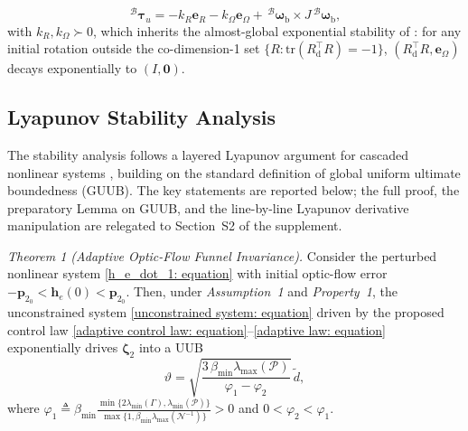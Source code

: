 \begin{equation} \label{so3 torque: equation}
    \,^\mathcal{B}\boldsymbol{\tau}_u = -k_R\boldsymbol{e}_R - k_\Omega\boldsymbol{e}_\Omega + \,^\mathcal{B} \boldsymbol{\omega}_{\text{b}}\times J\,^\mathcal{B} \boldsymbol{\omega}_{\text{b}},
\end{equation}
with $k_R,k_\Omega\succ 0$, which inherits the almost-global exponential stability of \cite[Thm.~3.1]{lee2010}: for any initial rotation outside the co-dimension-1 set $\{R:\text{tr}(R_\text{d}^\top R)=-1\}$, $(R_\text{d}^\top R,\boldsymbol{e}_\Omega)$ decays exponentially to $(I,\boldsymbol{0})$.

\subsection{Lyapunov Stability Analysis} \label{stability: section}
The stability analysis follows a layered Lyapunov argument for cascaded nonlinear systems \cite{khalil2002}, building on the standard definition of global uniform ultimate boundedness (GUUB). The key statements are reported below; the full proof, the preparatory Lemma on GUUB, and the line-by-line Lyapunov derivative manipulation are relegated to Section~S2 of the supplement.

\textit{Theorem 1 (Adaptive Optic-Flow Funnel Invariance).}
Consider the perturbed nonlinear system \eqref{h_e_dot_1: equation} with initial optic-flow error $-\boldsymbol{p}_{2_0}<\boldsymbol{h}_e(0)<\boldsymbol{p}_{2_0}$. Then, under \textit{Assumption~1} and \textit{Property~1}, the unconstrained system \eqref{unconstrained system: equation} driven by the proposed control law \eqref{adaptive control law: equation}--\eqref{adaptive law: equation} exponentially drives $\boldsymbol{\zeta}_2$ into a UUB
\begin{equation} \label{UUB bound: equation}
    \vartheta = \sqrt{\frac{3\,\beta_{\min}\lambda_{\max}(\mathcal{P})}{\varphi_1-\varphi_2}}\,\tilde{d},
\end{equation}
where $\varphi_1 \triangleq \beta_{\min}\frac{\min\{2\lambda_{\min}(\Gamma),\lambda_{\min}(\mathcal{P})\}}{\max\{1,\beta_{\min}\lambda_{\max}(\mathcal{N}^{-1})\}}>0$ and $0<\varphi_2<\varphi_1$.

